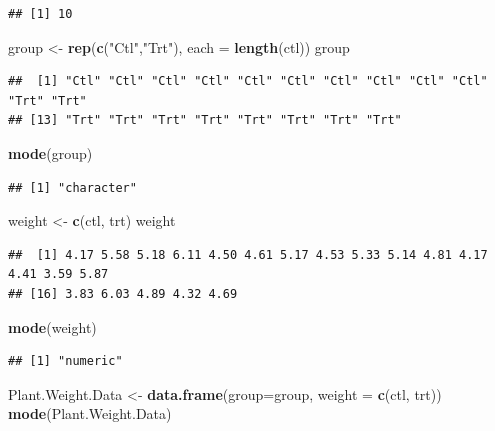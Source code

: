 \documentclass[
]{book}
\newenvironment{Shaded}{\begin{snugshade}}{\end{snugshade}}
\newcommand{\DataTypeTok}[1]{\textcolor[rgb]{0.13,0.29,0.53}{#1}}
\newcommand{\KeywordTok}[1]{\textcolor[rgb]{0.13,0.29,0.53}{\textbf{#1}}}
\newcommand{\NormalTok}[1]{#1}
\newcommand{\StringTok}[1]{\textcolor[rgb]{0.31,0.60,0.02}{#1}}
\begin{document}
\begin{verbatim}
## [1] 10
\end{verbatim}

\begin{Shaded}
\begin{Highlighting}[]
\NormalTok{group <-}\StringTok{ }\KeywordTok{rep}\NormalTok{(}\KeywordTok{c}\NormalTok{(}\StringTok{"Ctl"}\NormalTok{,}\StringTok{"Trt"}\NormalTok{), }\DataTypeTok{each =} \KeywordTok{length}\NormalTok{(ctl))}
\NormalTok{group}
\end{Highlighting}
\end{Shaded}

\begin{verbatim}
##  [1] "Ctl" "Ctl" "Ctl" "Ctl" "Ctl" "Ctl" "Ctl" "Ctl" "Ctl" "Ctl" "Trt" "Trt"
## [13] "Trt" "Trt" "Trt" "Trt" "Trt" "Trt" "Trt" "Trt"
\end{verbatim}

\begin{Shaded}
\begin{Highlighting}[]
\KeywordTok{mode}\NormalTok{(group)}
\end{Highlighting}
\end{Shaded}

\begin{verbatim}
## [1] "character"
\end{verbatim}

\begin{Shaded}
\begin{Highlighting}[]
\NormalTok{weight <-}\StringTok{ }\KeywordTok{c}\NormalTok{(ctl, trt)}
\NormalTok{weight}
\end{Highlighting}
\end{Shaded}

\begin{verbatim}
##  [1] 4.17 5.58 5.18 6.11 4.50 4.61 5.17 4.53 5.33 5.14 4.81 4.17 4.41 3.59 5.87
## [16] 3.83 6.03 4.89 4.32 4.69
\end{verbatim}

\begin{Shaded}
\begin{Highlighting}[]
\KeywordTok{mode}\NormalTok{(weight)}
\end{Highlighting}
\end{Shaded}

\begin{verbatim}
## [1] "numeric"
\end{verbatim}

\begin{Shaded}
\begin{Highlighting}[]
\NormalTok{Plant.Weight.Data <-}\StringTok{ }\KeywordTok{data.frame}\NormalTok{(}\DataTypeTok{group=}\NormalTok{group, }\DataTypeTok{weight =} \KeywordTok{c}\NormalTok{(ctl, trt)) }
\KeywordTok{mode}\NormalTok{(Plant.Weight.Data)}
\end{Highlighting}
\end{Shaded}
\end{document}
